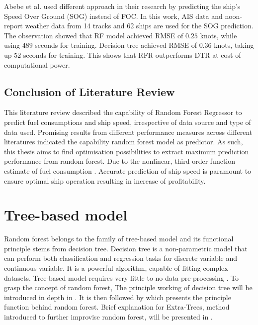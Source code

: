 Abebe et al. \citep{Abebe.2020} used different approach in their research by predicting the ship's Speed Over Ground (SOG) instead of FOC. In this work, AIS data and noon-report weather data from 14 tracks and 62 ships are used for the SOG prediction. The observation showed that RF model achieved RMSE of $0.25$ knots, while using $489$ seconds for training. Decision tree achieved RMSE of $0.36$ knots, taking up $52$ seconds for training. This shows that RFR outperforms DTR at cost of computational power.\\

\subsection{Conclusion of Literature Review}\label{sec:lit_review_conclusion}

This literature review described the capability of Random Forest Regressor to predict fuel consumptions and ship speed, irrespective of data source and type of data used. Promising results from different performance measures across different literatures indicated the capability random forest model as predictor. As such, this thesis aims to find optimisation possibilities to extract maximum prediction performance from random forest. Due to the nonlinear, third order function estimate of fuel consumption \citep{Ronen.1982,Ronen.2011}. Accurate prediction of ship speed is paramount to ensure optimal ship operation resulting in increase of profitability. 

\section{Tree-based model}\label{sec:tree_intro}

Random forest belongs to the family of tree-based model and its functional principle stems from decision tree. Decision tree is a non-parametric model that can perform both classification and regression tasks for discrete variable and continuous variable. It is a powerful algorithm, capable of fitting complex datasets. Tree-based model requires very little to no data pre-processing \citep{Geron.2019,Hastie.2009}. To grasp the concept of random forest, The principle working of decision tree will be introduced in depth in . It is then followed by  which presents the principle function behind random forest. Brief explanation for Extra-Trees, method introduced to further improvise random forest, will be presented in .\\

